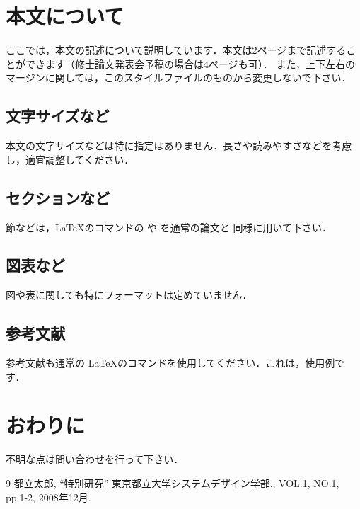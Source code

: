 \documentclass[a4paper]{jarticle}
\begin{document}
\section{本文について}
ここでは，本文の記述について説明しています．本文は2ページまで記述することができます（修士論文発表会予稿の場合は4ページも可）．
また，上下左右のマージンに関しては，このスタイルファイルのものから変更しないで下さい．

\subsection{文字サイズなど}
本文の文字サイズなどは特に指定はありません．長さや読みやすさなどを考慮し，適宜調整してください．
\subsection{セクションなど}
節などは，\LaTeX のコマンドの  や  を通常の論文と
同様に用いて下さい．

\subsection{図表など}
図や表に関しても特にフォーマットは定めていません．

\subsection{参考文献}
参考文献も通常の \LaTeX のコマンドを使用してください．これは，使用例です\cite{tarou1}．
\section{おわりに}
不明な点は問い合わせを行って下さい．

\begin{thebibliography}{9}\footnotesize
{} 都立太郎, ``特別研究'' 東京都立大学システムデザイン学部., VOL.1, NO.1,
	 pp.1-2, 2008年12月.

\end{thebibliography}
%
\end{document}
